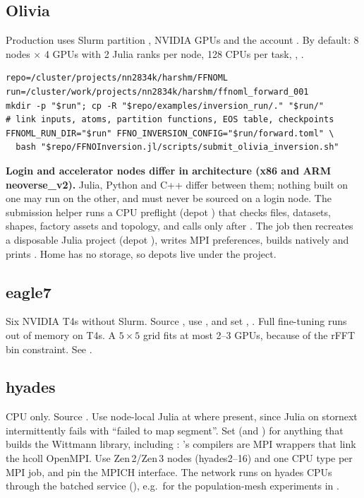 \subsection{Olivia}
Production uses Slurm partition , NVIDIA GPUs and the account . By default: 8 nodes $\times$ 4 GPUs with 2 Julia ranks per node, 128 CPUs per task, , .
\begin{lstlisting}
repo=/cluster/projects/nn2834k/harshm/FFNOML
run=/cluster/work/projects/nn2834k/harshm/ffnoml_forward_001
mkdir -p "$run"; cp -R "$repo/examples/inversion_run/." "$run/"
# link inputs, atoms, partition functions, EOS table, checkpoints
FFNOML_RUN_DIR="$run" FFNO_INVERSION_CONFIG="$run/forward.toml" \
  bash "$repo/FFNOInversion.jl/scripts/submit_olivia_inversion.sh"
\end{lstlisting}
\textbf{Login and accelerator nodes differ in architecture (x86 and ARM neoverse\_v2).} Julia, Python and C++ differ between them; nothing built on one may run on the other, and  must never be sourced on a login node. The submission helper runs a CPU preflight (depot ) that checks files, datasets, shapes, factory assets and topology, and calls  only after . The job then recreates a disposable Julia project (depot ), writes MPI preferences, builds  natively and prints . Home has no storage, so depots live under the project.

\subsection{eagle7}
Six NVIDIA T4s without Slurm. Source , use , and set , . Full fine-tuning runs out of memory on T4s. A $5\times5$ grid fits at most 2--3 GPUs, because of the rFFT bin constraint. See .

\subsection{hyades}
CPU only. Source . Use node-local Julia at  where present, since Julia on stornext intermittently fails with ``failed to map segment''. Set  (and ) for anything that builds the Wittmann library, including : 's compilers are MPI wrappers that link the hcoll OpenMPI. Use Zen\,2/Zen\,3 nodes (hyades2--16) and one CPU type per MPI job, and pin the MPICH interface. The network runs on hyades CPUs through the batched service (), e.g.\ for the population-mesh experiments in .

